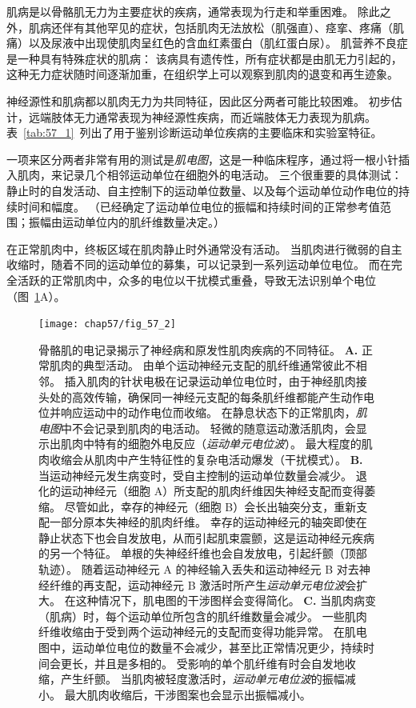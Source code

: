 肌病是以骨骼肌无力为主要症状的疾病，通常表现为行走和举重困难。
除此之外，肌病还伴有其他罕见的症状，包括肌肉无法放松（肌强直）、痉挛、疼痛（肌痛）以及尿液中出现使肌肉呈红色的含血红素蛋白（肌红蛋白尿）。
肌营养不良症是一种具有特殊症状的肌病：
该病具有遗传性，所有症状都是由肌无力引起的，这种无力症状随时间逐渐加重，在组织学上可以观察到肌肉的退变和再生迹象。


神经源性和肌病都以肌肉无力为共同特征，因此区分两者可能比较困难。
初步估计，远端肢体无力通常表现为神经源性疾病，而近端肢体无力表现为肌病。
表~\ref{tab:57_1}~列出了用于鉴别诊断运动单位疾病的主要临床和实验室特征。


一项来区分两者非常有用的测试是\textit{肌电图}，这是一种临床程序，通过将一根小针插入肌肉，来记录几个相邻运动单位在细胞外的电活动。
三个很重要的具体测试：静止时的自发活动、自主控制下的运动单位数量、以及每个运动单位动作电位的持续时间和幅度。
（已经确定了运动单位电位的振幅和持续时间的正常参考值范围；振幅由运动单位内的肌纤维数量决定。）


在正常肌肉中，终板区域在肌肉静止时外通常没有活动。
当肌肉进行微弱的自主收缩时，随着不同的运动单位的募集，可以记录到一系列运动单位电位。
而在完全活跃的正常肌肉中，众多的电位以干扰模式重叠，导致无法识别单个电位（图~\ref{fig:57_2}A）。


\begin{figure}[htbp]
	\centering
	\texttt{[image: chap57/fig\_57\_2]}
	\caption{骨骼肌的电记录揭示了神经病和原发性肌肉疾病的不同特征。
		\textbf{A.} 正常肌肉的典型活动。
		由单个运动神经元支配的肌纤维通常彼此不相邻。
		插入肌肉的针状电极在记录运动单位电位时，由于神经肌肉接头处的高效传输，确保同一神经元支配的每条肌纤维都能产生动作电位并响应运动中的动作电位而收缩。
		在静息状态下的正常肌肉，\textit{肌电图}中不会记录到肌肉的电活动。
		轻微的随意运动激活肌肉，会显示出肌肉中特有的细胞外电反应（\textit{运动单元电位波}）。
		最大程度的肌肉收缩会从肌肉中产生特征性的复杂电活动爆发（干扰模式）。
		\textbf{B.} 当运动神经元发生病变时，受自主控制的运动单位数量会减少。
		退化的运动神经元（细胞 A）所支配的肌肉纤维因失神经支配而变得萎缩。
		尽管如此，幸存的神经元（细胞 B）会长出轴突分支，重新支配一部分原本失神经的肌肉纤维。
		幸存的运动神经元的轴突即使在静止状态下也会自发放电，从而引起肌束震颤，这是运动神经元疾病的另一个特征。
		单根的失神经纤维也会自发放电，引起纤颤（顶部轨迹）。
		随着运动神经元 A 的神经输入丢失和运动神经元 B 对去神经纤维的再支配，运动神经元 B 激活时所产生\textit{运动单元电位波}会扩大。
		在这种情况下，肌电图的干涉图样会变得简化。
		\textbf{C.} 当肌肉病变（肌病）时，每个运动单位所包含的肌纤维数量会减少。 一些肌肉纤维收缩由于受到两个运动神经元的支配而变得功能异常。
		在肌电图中，运动单位电位的数量不会减少，甚至比正常情况更少，持续时间会更长，并且是多相的。
		受影响的单个肌纤维有时会自发地收缩，产生纤颤。
		当肌肉被轻度激活时，\textit{运动单元电位波}的振幅减小。
		最大肌肉收缩后，干涉图案也会显示出振幅减小。}
	\label{fig:57_2}
\end{figure}


